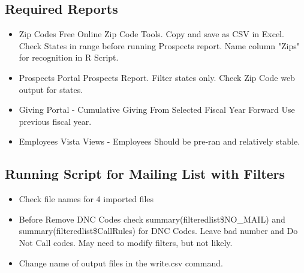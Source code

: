 \documentclass{article}
\begin{document}
\subsection{Required Reports}
\begin{itemize}
	\item Zip Codes
	\subitem Free Online Zip Code Tools. Copy and save as CSV in Excel.
	\subitem Check States in range before running Prospects report.
	\subitem Name column "Zips" for recognition in R Script.
	\item Prospects
	\subitem Portal Prospects Report. Filter states only. Check Zip Code web output for states.
	\item Giving
	\subitem Portal - Cumulative Giving From Selected Fiscal Year Forward
	\subitem Use previous fiscal year.
	\item Employees
	\subitem Vista Views - Employees
	\subitem Should be pre-ran and relatively stable.
\end{itemize}
\subsection{Running Script for Mailing List with Filters}
\begin{itemize}
	\item Check file names for 4 imported files
	\item Before Remove DNC Codes check summary(filteredlist\$NO\_MAIL) and summary(filteredlist\$CallRules) for DNC Codes. 
	\subitem Leave bad number and Do Not Call codes. May need to modify filters, but not likely.
	\item Change name of output files in the write.csv command.
\end{itemize}
\end{document}
